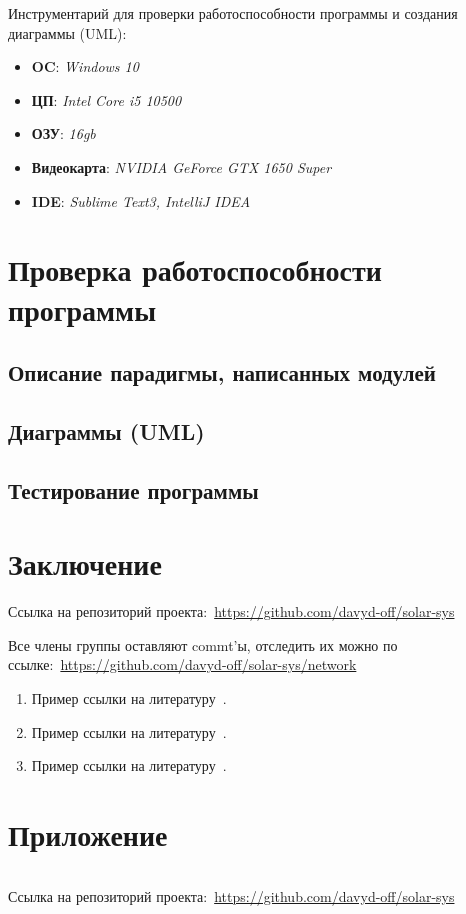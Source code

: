 \documentclass[14pt, oneside]{altsu-report}
\begin{document}
Инструментарий для проверки работоспособности программы и создания диаграммы (UML):
    \begin{itemize}
        \item \textbf{OC}: \textit{Windows 10}
        \item \textbf{ЦП}: \textit{Intel Core i5 10500}
        \item \textbf{ОЗУ}: \textit{16gb}
        \item \textbf{Видеокарта}: \textit{NVIDIA GeForce GTX 1650 Super}
        \item \textbf{IDE}: \textit{Sublime Text3, IntelliJ IDEA}
    \end{itemize}


\chapter{Проверка работоспособности программы}\label{ch2}
\section{Описание парадигмы, написанных модулей}
\section{Диаграммы (UML)}
\section{Тестирование программы}

\chapter*{Заключение}
Ссылка на репозиторий проекта:~\textcolor{blue}{\url{https://github.com/davyd-off/solar-sys}}

Все члены группы оставляют commt'ы, отследить их можно по ссылке:~\textcolor{blue}{\url{https://github.com/davyd-off/solar-sys/network}}


\begin{enumerate}
\item Пример ссылки на литературу~\cite{wikiRUBitbucket}.
\item Пример ссылки на литературу~\cite{wikiRUIdSoftware}.
\item Пример ссылки на литературу~\cite{wikiRUGitHub}.
\end{enumerate}

\newpage
{}
\printbibliography[title={Список использованной литературы}]

\newpage
\chapter*{Приложение}

\begin{code}
\label{code:solar-sys}
\inputminted[mathescape,linenos,frame=lines,breaklines]{Python}{src/SolarSystem.py}
\end{code}
Ссылка на репозиторий проекта:~\textcolor{blue}{\url{https://github.com/davyd-off/solar-sys}}
\end{document}
